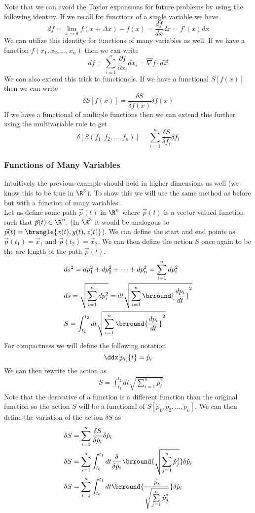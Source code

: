 Note that we can avoid the Taylor expansions for future problems by using the following identity. If we recall for functions of a single variable we have
\[df=\lim_{x\to0}f(x+\Delta x)-f(x)=\frac{df}{dx}dx=f'(x)dx\]
We can utilize this identity for functions of many variables as well. If we have a function $f(x_1,x_2,\dots,x_n)$ then we can write
\[df=\sum_{i=1}^n\frac{\partial f}{\partial x_i}dx_i=\vec{\nabla}f\cdot d\vec{x}\]
We can also extend this trick to functionals. If we have a functional $S[f(x)]$ then we can write
\[\delta S[f(x)]=\frac{\delta S}{\delta f(x)}\delta f(x)\]
If we have a functional of multiple functions then we can extend this further using the multivariable rule to get
\[\delta[S(f_1,f_2,\ldots, f_n)]=\sum_{i=1}^n\frac{\delta S}{\delta f_i}\delta f_i\]
\subsubsection{Functions of Many Variables}
Intuitively the previous example should hold in higher dimensions as well (we know this to be true in $\R^3$). To show this we will use the same method as before but with a function of many variables.\\
Let us define some path $\vec{p}(t)$ in $\R^n$ where $\vec{p}(t)$ is a vector valued function such that $\vec{p}(t)\in\R^n$. (In $\R^3$ it would be analogous to $\vec{p}(t)=\brangle{x(t),y(t),z(t)}$). We can define the start and end points as $\vec{p}(t_1)=\vec{x}_1$ and $\vec{p}(t_2)=\vec{x}_2$. We can then define the action $S$ once again to be the arc length of the path $\vec{p}(t)$.
\begin{align*}
    &ds^2=dp_1^2+dp_2^2+\dots+dp_n^2=\sum_{i=1}^n dp_i^2\\
    &ds=\sqrt{\sum_{i=1}^n dp_i^2}=dt\sqrt{\sum_{i=1}^n\brround{\frac{dp_i}{dt}}^2}\\
    &S=\int_{t_1}^{t_2}dt\sqrt{\sum_{i=1}^n\brround{\frac{dp_i}{dt}}^2}
\end{align*}
For compactness we will define the following notation
\[\ddx[p_i]{t}=\dot{p}_i\]
We can then rewrite the action as
\begin{align*}
    &S=\int_{t_1}^{t_2}dt\sqrt{\sum_{i=1}^n\dot{p}_i^2}
\end{align*}
Note that the derivative of a function is a different function than the original function so the action $S$ will be a functional of $S[\dot{p}_1,\dot{p}_2,\ldots,\dot{p}_n]$. We can then define the variation of the action $\delta S$ as
\begin{align*}
    &\delta S=\sum_{i=1}^n\frac{\delta S}{\delta \dot{p}_i}\delta \dot{p}_i\\
    &\delta S=\sum_{i=1}^n\int_{t_0}^{t_1}dt\frac{\delta}{\delta \dot{p}_i}\brround{\sqrt{\sum_{j=1}^n\dot{p}_j^2}}\delta \dot{p}_i\\
    &\displaystyle\delta S=\sum_{i=1}^n\int_{t_0}^{t_1}dt\brround{\frac{\dot{p}_i}{\sqrt{\sum\limits_{j=1}^n \dot{p}_j^2}}}\delta \dot{p}_i
\end{align*}
